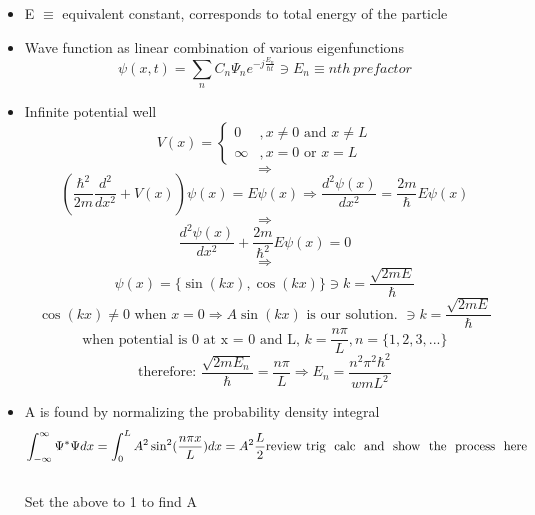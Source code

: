 \documentclass{article}
\begin{document}
\begin{itemize}
\item E $\equiv$ equivalent constant, corresponds to total energy of the particle
\item Wave function as linear combination of various eigenfunctions
  \begin{equation}
    \label{eigenfunctions}
    \psi (x,t)=\sum_{n}C_{n}\Psi_{n}e^{-j\frac{E_{n}}{\hbar t}} \ni E_{n}\equiv nth~prefactor
  \end{equation}
\item Infinite potential well
  \[V(x) = \left\{
  \begin{array}{lr}
    0 & , x \neq 0 \text{ and } x \neq L\\
    \infty & , x = 0 \text{ or } x = L
  \end{array}
  \right.
  \]
  $$\Rightarrow$$
  \begin{equation}
    (\frac{\hbar^2}{2m}\frac{d^2}{dx^2}+V(x))\psi(x)=E\psi(x)\Rightarrow\frac{d^2\psi(x)}{dx^2}=\frac{2m}{\hbar}E\psi(x)
  \end{equation}$$\Rightarrow$$
  \begin{equation}
    \frac{d^2\psi(x)}{dx^2}+\frac{2m}{\hbar^2}E\psi(x)=0
  \end{equation}$$\Rightarrow$$
  \begin{equation}
    \psi(x)=\{\sin(kx),\cos(kx)\}\ni k=\frac{\sqrt{2mE}}{\hbar}
  \end{equation}
  \begin{equation}
    \cos(kx)\neq 0\text{ when }x=0\Rightarrow A\sin(kx)\text{ is our solution. }\ni k=\frac{\sqrt{2mE}}{\hbar}
  \end{equation}
  \begin{equation}
    \text{when potential is 0 at x = 0 and L, }k=\frac{n\pi}{L},n=\{1,2,3,...\}
  \end{equation}
  \begin{equation}
    \text{therefore: }\frac{\sqrt{2mE_n}}{\hbar} = \frac{n\pi}{L}\Rightarrow E_n=\frac{n^2\pi^2\hbar^2}{wmL^2}
  \end{equation}
\item A is found by normalizing the probability density integral
  \begin{equation}
    \int_{-\infty}^{\infty}\Psi^*\Psi dx=\int_0^LA^2\sin^2(\frac{n\pi x}{L})dx = A^2\frac{L}{2} \text{\\review~trig~ calc~ and~ show~  the~ process~ here}
  \end{equation}
  \\Set the above to 1 to find A
  \begin{equation}

\end{equation}
\end{itemize}
\end{document}
